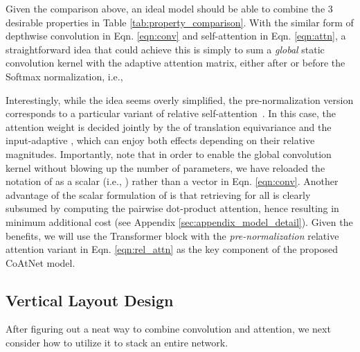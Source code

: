 \documentclass{article}
\newcommand{\name}{CoAtNet\xspace}
\begin{document}
Given the comparison above, an ideal model should be able to combine the 3 desirable properties in Table \ref{tab:property_comparison}.
With the similar form of depthwise convolution in Eqn. \eqref{eqn:conv} and self-attention in Eqn. \eqref{eqn:attn}, a straightforward idea that could achieve this is simply to sum a \textit{global} static convolution kernel with the adaptive attention matrix, either after or before the Softmax normalization, i.e.,

Interestingly, while the idea seems overly simplified, the pre-normalization version  corresponds to a particular variant of relative self-attention~\cite{shaw2018self,raffel2019exploring}.
In this case, the attention weight  is decided jointly by the  of translation equivariance and the input-adaptive , which can enjoy both effects depending on their relative magnitudes.
Importantly, note that in order to enable the global convolution kernel without blowing up the number of parameters, we have reloaded the notation of  as a scalar (i.e., ) rather than a vector in Eqn. \eqref{eqn:conv}.
Another advantage of the scalar formulation of  is that retrieving  for all  is clearly subsumed by computing the pairwise dot-product attention, hence resulting in minimum additional cost (see Appendix \ref{sec:appendix_model_detail}).
Given the benefits, we will use the Transformer block with the \textit{pre-normalization} relative attention variant in Eqn. \eqref{eqn:rel_attn} as the key component of the proposed \name model.

\subsection{Vertical Layout Design}
After figuring out a neat way to combine convolution and attention, we next consider how to utilize it to stack an entire network.
\end{document}
